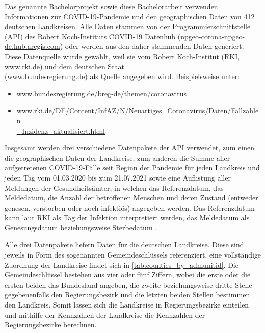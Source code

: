 Das genannte Bachelorprojekt sowie diese Bachelorarbeit verwenden Informationen zur COVID-19-Pandemie und den geographischen Daten von 412 deutschen Landkreisen. Alle Daten stammen von der Programmierschnittstelle (API) des Robert Koch-Instituts \glqq{}COVID-19 Datenhub\grqq{}
(\href{npgeo-corona-npgeo-de.hub.arcgis.com}{npgeo-corona-npgeo-de.hub.arcgis.com}) oder werden aus den daher stammenden Daten generiert. Diese Datenquelle wurde gewählt, weil sie vom Robert Koch-Institut (RKI, \href{www.rki.de}{www.rki.de}) und dem deutschen Staat\\
 (www.bundesregierung.de) als Quelle angegeben wird. Beispielsweise unter:
\begin{itemize}
    \item \href{www.bundesregierung.de/breg-de/themen/coronavirus}{www.bundesregierung.de/breg-de/themen/coronavirus}
    \item \href{www.rki.de/DE/Content/InfAZ/N/Neuartiges_Coronavirus/Daten/Fallzahlen_Inzidenz_aktualisiert.html}{www.rki.de/DE/Content/InfAZ/N/Neuartiges\_Coronavirus/Daten/Fallzahlen}\\
    \href{www.rki.de/DE/Content/InfAZ/N/Neuartiges_Coronavirus/Daten/Fallzahlen_Inzidenz_aktualisiert.html}{\_Inzidenz\_aktualisiert.html}
\end{itemize}

Insgesamt werden drei verschiedene Datenpakete der API verwendet, zum einen die geographischen Daten der Landkreise, zum anderen die Summe aller aufgetretenen COVID-19-Fälle seit Beginn der Pandemie für jeden Landkreis und jeden Tag vom 01.03.2020 bis zum 21.07.2021 sowie eine Auflistung aller Meldungen der Gesundheitsämter, in welchen das  Referenzdatum, das Meldedatum, die Anzahl der betroffenen Menschen und deren Zustand (entweder genesen, verstorben oder noch infektiös) angegeben werden. Das Referenzdatum kann laut RKI als Tag der Infektion interpretiert werden, das Meldedatum als Genesungsdatum beziehungsweise Sterbedatum \autocite{RKI_Bulletin}.

Alle drei Datenpakete liefern Daten für die deutschen Landkreise. Diese sind jeweils in Form des sogenannten Gemeindeschlüssels referenziert, eine vollständige Zuordnung der Landkreise findet sich in \autoref{tab:counties_by_admunitid}. Die Gemeindeschlüssel bestehen aus vier oder fünf Ziffern, wobei die erste oder die ersten beiden das Bundesland angeben, die zweite beziehungsweise dritte Stelle gegebenenfalls den Regierungsbezirk und die letzten beiden Stellen bestimmen den Landkreis. Somit lassen sich die Landkreise in Regierungsbezirke einteilen und mithilfe der Kennzahlen der Landkreise die Kennzahlen der Regierungsbezirke berechnen.

